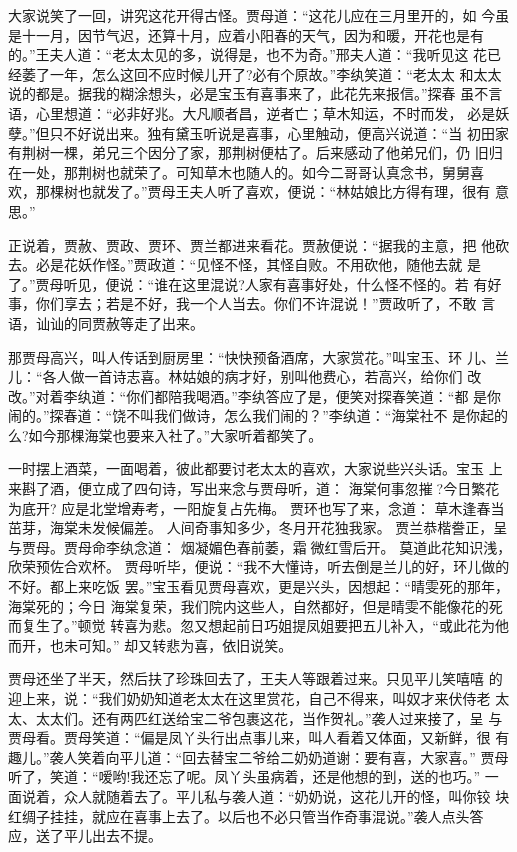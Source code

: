 大家说笑了一回，讲究这花开得古怪。贾母道：“这花儿应在三月里开的，如
今虽是十一月，因节气迟，还算十月，应着小阳春的天气，因为和暖，开花也是有
的。”王夫人道：“老太太见的多，说得是，也不为奇。”邢夫人道：“我听见这
花已经萎了一年，怎么这回不应时候儿开了?必有个原故。”李纨笑道：“老太太
和太太说的都是。据我的糊涂想头，必是宝玉有喜事来了，此花先来报信。”探春
虽不言语，心里想道：“必非好兆。大凡顺者昌，逆者亡；草木知运，不时而发，
必是妖孽。”但只不好说出来。独有黛玉听说是喜事，心里触动，便高兴说道：“当
初田家有荆树一棵，弟兄三个因分了家，那荆树便枯了。后来感动了他弟兄们，仍
旧归在一处，那荆树也就荣了。可知草木也随人的。如今二哥哥认真念书，舅舅喜
欢，那棵树也就发了。”贾母王夫人听了喜欢，便说：“林姑娘比方得有理，很有
意思。”

正说着，贾赦、贾政、贾环、贾兰都进来看花。贾赦便说：“据我的主意，把
他砍去。必是花妖作怪。”贾政道：“见怪不怪，其怪自败。不用砍他，随他去就
是了。”贾母听见，便说：“谁在这里混说?人家有喜事好处，什么怪不怪的。若
有好事，你们享去；若是不好，我一个人当去。你们不许混说！”贾政听了，不敢
言语，讪讪的同贾赦等走了出来。

那贾母高兴，叫人传话到厨房里：“快快预备酒席，大家赏花。”叫宝玉、环
儿、兰儿：“各人做一首诗志喜。林姑娘的病才好，别叫他费心，若高兴，给你们
改改。”对着李纨道：“你们都陪我喝酒。”李纨答应了是，便笑对探春笑道：“都
是你闹的。”探春道：“饶不叫我们做诗，怎么我们闹的？”李纨道：“海棠社不
是你起的么?如今那棵海棠也要来入社了。”大家听着都笑了。

一时摆上酒菜，一面喝着，彼此都要讨老太太的喜欢，大家说些兴头话。宝玉
上来斟了酒，便立成了四句诗，写出来念与贾母听，道：
海棠何事忽摧?今日繁花为底开?
应是北堂增寿考，一阳旋复占先梅。
贾环也写了来，念道：
草木逢春当茁芽，海棠未发候偏差。
人间奇事知多少，冬月开花独我家。
贾兰恭楷誊正，呈与贾母。贾母命李纨念道：
烟凝媚色春前萎，霜微红雪后开。
莫道此花知识浅，欣荣预佐合欢杯。
贾母听毕，便说：“我不大懂诗，听去倒是兰儿的好，环儿做的不好。都上来吃饭
罢。”宝玉看见贾母喜欢，更是兴头，因想起：“晴雯死的那年，海棠死的；今日
海棠复荣，我们院内这些人，自然都好，但是晴雯不能像花的死而复生了。”顿觉
转喜为悲。忽又想起前日巧姐提凤姐要把五儿补入，“或此花为他而开，也未可知。”
却又转悲为喜，依旧说笑。

贾母还坐了半天，然后扶了珍珠回去了，王夫人等跟着过来。只见平儿笑嘻嘻
的迎上来，说：“我们奶奶知道老太太在这里赏花，自己不得来，叫奴才来伏侍老
太太、太太们。还有两匹红送给宝二爷包裹这花，当作贺礼。”袭人过来接了，呈
与贾母看。贾母笑道：“偏是凤丫头行出点事儿来，叫人看着又体面，又新鲜，很
有趣儿。”袭人笑着向平儿道：“回去替宝二爷给二奶奶道谢：要有喜，大家喜。”
贾母听了，笑道：“嗳哟!我还忘了呢。凤丫头虽病着，还是他想的到，送的也巧。”
一面说着，众人就随着去了。平儿私与袭人道：“奶奶说，这花儿开的怪，叫你铰
块红绸子挂挂，就应在喜事上去了。以后也不必只管当作奇事混说。”袭人点头答
应，送了平儿出去不提。

